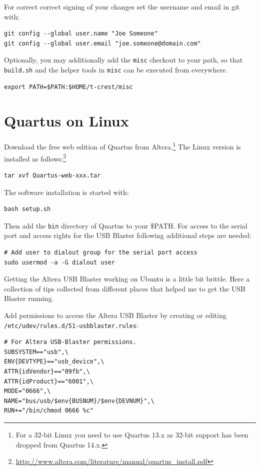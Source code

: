 \documentclass[a4paper,fontsize=10pt,twoside,DIV15,BCOR12mm,headinclude=true,footinclude=false,pagesize,bibtotoc]{scrbook}
\newcommand{\code}[1]{{\texttt{#1}}}
\begin{document}
For correct correct signing of your changes set the username and
email in git with:

\begin{verbatim}
git config --global user.name "Joe Someone"
git config --global user.email "joe.someone@domain.com"
\end{verbatim}

Optionally, you may additionally add the \code{misc} checkout to your path, so that \code{build.sh} and the helper tools in 
\code{misc} can be executed from everywhere.

\begin{verbatim}
export PATH=$PATH:$HOME/t-crest/misc
\end{verbatim}


\section{Quartus on Linux}

Download the free web edition of Quartus from Altera.\footnote{For a 32-bit Linux you need to
use Quartus 13.x as 32-bit support has been dropped from Quartus 14.x.}
The Linux version is
installed as follows:\footnote{\url{http://www.altera.com/literature/manual/quartus_install.pdf}}

\begin{verbatim}
tar xvf Quartus-web-xxx.tar
\end{verbatim}

The software installation is started with:

\begin{verbatim}
bash setup.sh
\end{verbatim}

Then add the \code{bin} directory of Quartus to your \$PATH.
%
For access to the serial port and access rights for the USB Blaster following additional steps are needed:

\begin{verbatim}
# Add user to dialout group for the serial port access
sudo usermod -a -G dialout user
\end{verbatim}

Getting the Altera USB Blaster working on Ubuntu is a little bit brittle.
Here a collection of tips collected from different places that helped me to
get the USB Blaster running.

Add permissions to access the Altera USB Blaster by creating or editing \code{/etc/udev/rules.d/51-usbblaster.rules}:

\begin{verbatim}
# For Altera USB-Blaster permissions.
SUBSYSTEM=="usb",\
ENV{DEVTYPE}=="usb_device",\
ATTR{idVendor}=="09fb",\
ATTR{idProduct}=="6001",\
MODE="0666",\
NAME="bus/usb/$env{BUSNUM}/$env{DEVNUM}",\
RUN+="/bin/chmod 0666 %c"
\end{verbatim}
\end{document}
